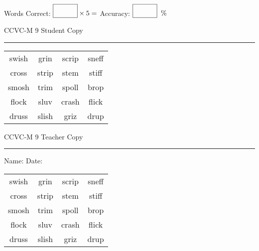 \documentclass{memoir}
\begin{document}
\small

Words Correct: $\fbox{\phantom{\huge 100}} \times 5 = $ Accuracy: $\fbox{\phantom{\huge 100}}\;\; \%$ 

\vfill

\newpage


\footnotesize \noindent
CCVC-M 9 \hfill Student Copy
\smallskip
\hrule

\Large

\setlength{\tabcolsep}{14pt}
\def\arraystretch{3}

{\selectfont


\begin{vplace}[0.5]
\begin{center}
\begin{tabular}{cccc}
swish & grin     & scrip & sneff \\
cross & strip & stem & stiff \\
smosh & trim & spoll & brop   \\
flock & sluv & crash & flick            \\
druss & slish & griz & drup \\
\end{tabular}
\end{center}
\end{vplace}

}

\newpage

\footnotesize \noindent
CCVC-M 9 \hfill Teacher Copy
\smallskip
\hrule

\small

\vfill

\noindent
Name: \underline{\hspace{1.75in}} \hfill Date: \underline{\hspace{1in}}

\Large

{\selectfont


\begin{vplace}[0.5]
\begin{center}
\begin{tabular}{cccc}
swish & grin     & scrip & sneff \\
cross & strip & stem & stiff \\
smosh & trim & spoll & brop   \\
flock & sluv & crash & flick            \\
druss & slish & griz & drup \\
\end{tabular}
\end{center}
\end{vplace}



}
\end{document}
